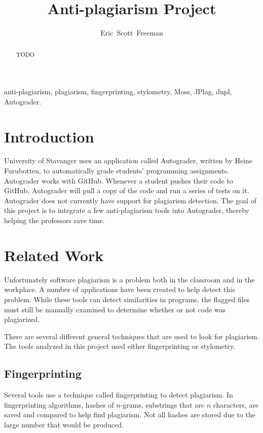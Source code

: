 \documentclass[journal,comsoc]{IEEEtran}
\begin{document}
	\title{Anti-plagiarism Project}
	\author{Eric~Scott~Freeman}
	
	\maketitle
	
	\begin{abstract}
		TODO
	\end{abstract}
		
	\begin{IEEEkeywords}
		anti-plagiarism, plagiarism, fingerprinting, stylometry, Moss, JPlag, dupl, Autograder.
	\end{IEEEkeywords}
	
	\IEEEpeerreviewmaketitle

	\section{Introduction}
	
	 University of Stavanger uses an application called Autograder, written by Heine Furubotten, to automatically grade students' programming assignments. Autograder works with GitHub. Whenever a student pushes their code to GitHub, Autograder will pull a copy of the code and run a series of tests on it. Autograder does not currently have support for plagiarism detection. The goal of this project is to integrate a few anti-plagiarism tools into Autograder, thereby helping the professors save time.

	\section{Related Work}
	Unfortunately software plagiarism is a problem both in the classroom and in the workplace. A number of applications have been created to help detect this problem. While these tools can detect similarities in programs, the flagged files must still be manually examined to determine whether or not code was plagiarized.
		
	There are several different general techniques that are used to look for plagiarism. The tools analyzed in this project used either fingerprinting or stylometry.
		
		\subsection{Fingerprinting}
		Several tools use a technique called fingerprinting to detect plagiarism. In fingerprinting algorithms, hashes of $n$-grams, substrings that are $n$ characters, are saved and compared to help find plagiarism. Not all hashes are stored due to the large number that would be produced. 
		
\end{document}
